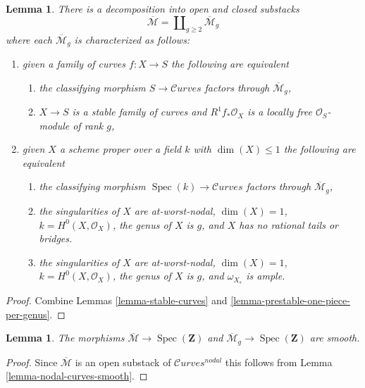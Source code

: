 \documentclass{stacks-project}
\theoremstyle{plain}
\newtheorem{lemma}[subsection]{Lemma}
\theoremstyle{definition}
\theoremstyle{remark}
\numberwithin{equation}{subsection}
\def\Spec{\mathop{\mathrm{Spec}}}
\def\Curvesstack{\mathcal{C}\!\mathit{urves}}
\begin{document}
\begin{lemma}
\label{lemma-stable-one-piece-per-genus}
There is a decomposition into open and closed substacks
$$
\overline{\mathcal{M}} = \coprod\nolimits_{g \geq 2} \overline{\mathcal{M}}_g
$$
where each $\overline{\mathcal{M}}_g$ is characterized as follows:
\begin{enumerate}
\item given a family of curves $f : X \to S$ the following are equivalent
\begin{enumerate}
\item the classifying morphism $S \to \Curvesstack$ factors
through $\overline{\mathcal{M}}_g$,
\item $X \to S$ is a stable family of curves and
$R^1f_*\mathcal{O}_X$ is a locally free $\mathcal{O}_S$-module of rank $g$,
\end{enumerate}
\item given $X$ a scheme proper over a field $k$ with
$\dim(X) \leq 1$ the following are equivalent
\begin{enumerate}
\item the classifying morphism $\Spec(k) \to \Curvesstack$
factors through $\overline{\mathcal{M}}_g$,
\item the singularities of $X$ are at-worst-nodal, $\dim(X) = 1$,
$k = H^0(X, \mathcal{O}_X)$, the genus of $X$ is $g$, and $X$
has no rational tails or bridges.
\item the singularities of $X$ are at-worst-nodal, $\dim(X) = 1$,
$k = H^0(X, \mathcal{O}_X)$, the genus of $X$ is $g$, and
$\omega_{X_s}$ is ample.
\end{enumerate}
\end{enumerate}
\end{lemma}

\begin{proof}
Combine Lemmas \ref{lemma-stable-curves} and
\ref{lemma-prestable-one-piece-per-genus}.
\end{proof}

\begin{lemma}
\label{lemma-stable-curves-smooth}
The morphisms
$\overline{\mathcal{M}} \to \Spec(\mathbf{Z})$ and
$\overline{\mathcal{M}}_g \to \Spec(\mathbf{Z})$
are smooth.
\end{lemma}

\begin{proof}
Since $\overline{\mathcal{M}}$ is an open substack of
$\Curvesstack^{nodal}$ this follows from
Lemma \ref{lemma-nodal-curves-smooth}.
\end{proof}
\end{document}
